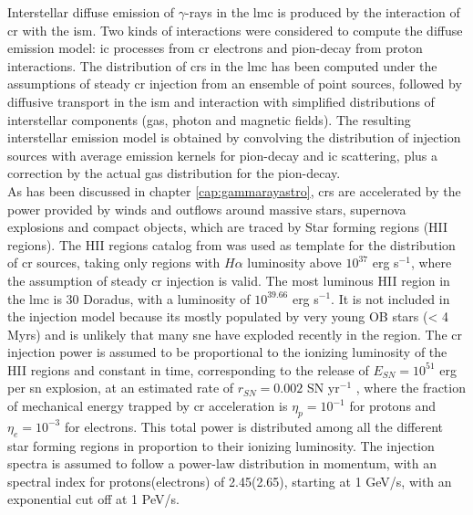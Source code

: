 \documentclass[main.tex]{subfiles}
\begin{document}
Interstellar diffuse emission of $\gamma$-rays in the \gls{lmc} is produced by the interaction of \gls{cr} with the \gls{ism}. Two kinds of interactions were considered to compute the diffuse emission model: \gls{ic} processes from \gls{cr} electrons and pion-decay from proton interactions. The distribution of \glspl{cr} in the \gls{lmc} has been computed under the assumptions of steady \gls{cr} injection from an ensemble of point sources, followed by diffusive transport in the \gls{ism} and interaction with simplified distributions of interstellar components (gas, photon and magnetic fields). The resulting interstellar emission model is obtained by convolving the distribution of injection sources with average emission kernels for pion-decay and \gls{ic} scattering, plus a correction by the actual gas distribution for the pion-decay.\\
As has been discussed in chapter \ref{cap:gammarayastro}, \glspl{cr} are accelerated by the power provided by winds and outflows around massive stars, supernova explosions and compact objects, which are traced by Star forming regions (HII regions). The HII regions catalog from \cite{2012HIIinLMC} was used as template for the distribution of \gls{cr} sources, taking only regions with $H\alpha$ luminosity above $10^{37}$ erg s$^{-1}$, where the assumption of steady \gls{cr} injection is valid. The most luminous HII region in the \gls{lmc} is 30 Doradus, with a luminosity of $10^{39.66}$ erg s$^{-1}$. It is not included in the injection model because its mostly populated by very young OB stars (< 4 Myrs) \cite{201130Doradusstarforming} and is unlikely that many \gls{sne} have exploded recently in the region. The \gls{cr} injection power is assumed to be proportional to the ionizing luminosity of the HII regions and constant in time, corresponding to the release of $E_{SN} = 10^{51}$ erg per \gls{sn} explosion, at an estimated rate of $r_{SN} =  0.002$ SN yr$^{-1}$ \cite{1991SNrates}, where the fraction of mechanical energy trapped by \gls{cr} acceleration is $\eta_{p} = 10^{-1}$ for protons and $\eta_{e} = 10^{-3}$ for electrons. This total power is distributed among all the different star forming regions in proportion to their ionizing luminosity.
The injection spectra is assumed to follow a power-law distribution in momentum, with an spectral index for protons(electrons) of 2.45(2.65), starting at 1 GeV/s, with an exponential cut off at 1 PeV/s.\\
\end{document}
